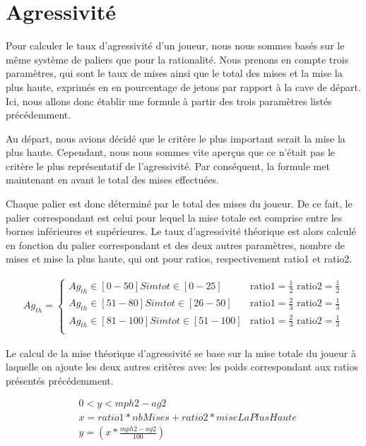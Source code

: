 \documentclass{report}
\begin{document}
\section{Agressivité}

\hspace{0.5cm}Pour calculer le taux d'agressivité d'un joueur, nous nous sommes basés sur le même système de paliers que pour la rationalité. Nous prenons en compte trois paramètres, qui sont le taux de mises ainsi que le total des mises et la mise la plus haute, exprimés en en pourcentage de jetons par rapport à la cave de départ. Ici, nous allons donc établir une formule à partir des trois paramètres listés précédemment.\par

Au départ, nous avions décidé que le critère le plus important serait la mise la plus haute. Cependant, nous nous sommes vite aperçus que ce n'était pas le critère le plus représentatif de l'agressivité. Par conséquent, la formule met maintenant en avant le total des mises effectuées.

Chaque palier est donc déterminé par le total des mises du joueur. De ce fait, le palier correspondant est celui pour lequel la mise totale est comprise entre les bornes inférieures et supérieures. Le taux d'agressivité théorique est alors calculé en fonction du palier correspondant et des deux autres paramètres, nombre de mises et mise la plus haute, qui ont pour ratios, respectivement ratio1 et ratio2. \par

\small{
\begin{align*}
	Ag_{th}=
	\begin{cases}
		Ag_{th} \in [0-50] Si mtot \in [0-25] &\text{ratio1}=\frac{1}{2} \text{ ratio2}=\frac{1}{2} \\
		Ag_{th} \in [51-80] Si mtot \in [26-50] &\text{ratio1}=\frac{2}{3} \text{ ratio2}=\frac{1}{3} \\
		Ag_{th} \in [81-100] Si mtot \in [51-100]  &\text{ratio1}=\frac{2}{3} \text{ ratio2}=\frac{1}{3}\\
	\end{cases}
\end{align*}
}


Le calcul de la mise théorique d'agressivité se base sur la mise totale du joueur à laquelle on ajoute les deux autres critères avec les poids correspondant aux ratios présentés précédemment. \par
\begin{align*}
	&0<y<mph2-ag2\\
	&x=ratio1 * nbMises + ratio2 * miseLaPlusHaute\\
	&y=\left(x*\frac{mph2-ag2}{100}\right)
\end{align*}
\end{document}
